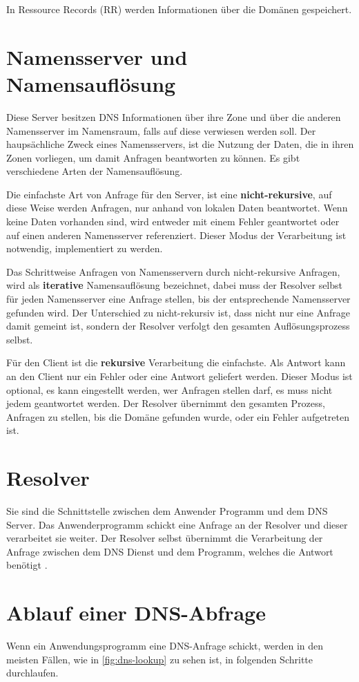 In Ressource Records (RR) werden Informationen über die Domänen gespeichert.

\section{Namensserver und Namensauflösung}
Diese Server besitzen DNS Informationen über ihre Zone und über die anderen Namensserver im Namensraum, falls auf diese verwiesen werden soll.
Der haupsächliche Zweck eines Namensservers, ist die Nutzung der Daten, die in ihren Zonen vorliegen, um damit Anfragen beantworten zu können.
Es gibt verschiedene Arten der Namensauflösung.

Die einfachste Art von Anfrage für den Server, ist eine \textbf{nicht-rekursive}, auf diese Weise werden Anfragen, nur anhand von lokalen Daten beantwortet.
Wenn keine Daten vorhanden sind, wird entweder mit einem Fehler geantwortet oder auf einen anderen Namensserver referenziert.
Dieser Modus der Verarbeitung ist notwendig, implementiert zu werden.

Das Schrittweise Anfragen von Namensservern durch nicht-rekursive Anfragen, wird als \textbf{iterative} Namensauflösung bezeichnet, dabei muss der Resolver selbst für jeden Namensserver eine Anfrage stellen, bis der entsprechende Namensserver gefunden wird.
Der Unterschied zu nicht-rekursiv ist, dass nicht nur eine Anfrage damit gemeint ist, sondern der Resolver verfolgt den gesamten Auflösungsprozess selbst.

Für den Client ist die \textbf{rekursive} Verarbeitung die einfachste.
Als Antwort kann an den Client nur ein Fehler oder eine Antwort geliefert werden.
Dieser Modus ist optional, es kann eingestellt werden, wer Anfragen stellen darf, es muss nicht jedem geantwortet werden.
Der Resolver übernimmt den gesamten Prozess, Anfragen zu stellen, bis die Domäne gefunden wurde, oder ein Fehler aufgetreten ist.

\section{Resolver}
Sie sind die Schnittstelle zwischen dem Anwender Programm und dem DNS Server.
Das Anwenderprogramm schickt eine Anfrage an der Resolver und dieser verarbeitet sie weiter.
Der Resolver selbst übernimmt die Verarbeitung der Anfrage zwischen dem DNS Dienst und dem Programm, welches die Antwort benötigt \cite{ietf-rfc-1034}.

\section{Ablauf einer DNS-Abfrage}
Wenn ein Anwendungsprogramm eine DNS-Anfrage schickt, werden in den meisten Fällen, wie in \ref{fig:dns-lookup} zu sehen ist, in folgenden Schritte durchlaufen.


